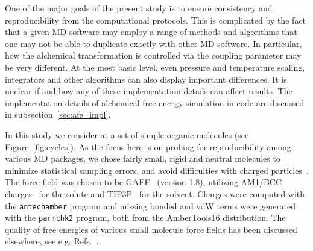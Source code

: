 \documentclass[journal=jctcce,manuscript=article]{achemso}
\newcommand{\progname}[1]{\texttt{#1}}
\begin{document}
One of the major goals of the present study is to ensure
consistency and reproducibility from the computational protocols.  This is complicated by the fact
that a given MD software may employ a range of methods and algorithms that one may not be
able to duplicate exactly with other MD software.
In particular, how the alchemical transformation is controlled via the coupling parameter may be very different.
At the most basic level, even pressure and temperature scaling, integrators and other algorithms can also display important differences.
It is unclear if and how any of these implementation details can affect results.
The implementation details of alchemical free energy simulation in code are discussed in subsection~\ref{sec:afe_impl}.

In this study we consider at a set of simple organic molecules (see
Figure~\ref{fig:cycles}).  As the focus here is on probing for
reproducibility among various MD packages, we chose fairly small,
rigid and neutral molecules to minimize statistical sampling errors, and
avoid difficulties with charged
particles~\cite{rocklin_calculating_2013, JCC:JCC1050}.  The force
field was chosen to be GAFF~\cite{wang_development_2004} (version
1.8), utilizing AM1/BCC charges~\cite{jakalian_fast_2000,
  jakalian_fast_2002} for the solute and
TIP3P~\cite{jorgensen_comparison_1983-1} for the solvent.
%
%
%
%
Charges were
computed with the \progname{antechamber} program and missing bonded and vdW
terms were generated with the \progname{parmchk2} program, both from the
AmberTools16 distribution.  The quality of free energies of various small
molecule force fields has been discussed
elsewhere, see e.g. Refs.~.
\end{document}
